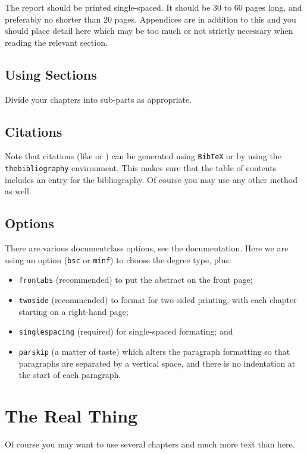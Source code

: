 \documentclass[bsc,frontabs,twoside,singlespacing,parskip,deptreport]{infthesis}     %
\begin{document}
The report should be printed single-spaced.
It should be 30 to 60 pages long, and preferably no shorter than 20 pages.
Appendices are in addition to this and you should place detail
here which may be too much or not strictly necessary when reading the relevant section.

\section{Using Sections}

Divide your chapters into sub-parts as appropriate.

\section{Citations}

Note that citations 
(like \cite{P1} or \cite{P2})
can be generated using {\tt BibTeX} or by using the
{\tt thebibliography} environment. This makes sure that the
table of contents includes an entry for the bibliography.
Of course you may use any other method as well.

\section{Options}

There are various documentclass options, see the documentation.  Here we are
using an option ({\tt bsc} or {\tt minf}) to choose the degree type, plus:
\begin{itemize}
\item {\tt frontabs} (recommended) to put the abstract on the front page;
\item {\tt twoside} (recommended) to format for two-sided printing, with
  each chapter starting on a right-hand page;
\item {\tt singlespacing} (required) for single-spaced formating; and
\item {\tt parskip} (a matter of taste) which alters the paragraph formatting so that
paragraphs are separated by a vertical space, and there is no
indentation at the start of each paragraph.
\end{itemize}

\chapter{The Real Thing}

Of course
you may want to use several chapters and much more text than here.



\end{document}
